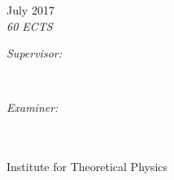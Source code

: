 \begin{titlingpage}
{\Large July 2017}\\ [0.3cm] \textit{60 ECTS}\\ %

\vspace{5mm}
\begin{minipage}[t]{0.4\textwidth}
\begin{flushleft} \large
\emph{\textit{Supervisor:}} \\
\end{flushleft}
\end{minipage}
~
\begin{minipage}[t]{0.4\textwidth}
\begin{flushright} \large
\emph{\textit{Examiner:}} \\
\\
\end{flushright}
\end{minipage}\\[1cm]



\large Institute for Theoretical Physics \\ [0.5cm]

\vfill %

\end{titlingpage}
